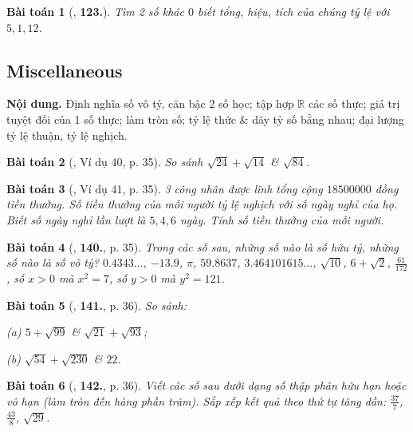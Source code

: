 \documentclass{article}
\numberwithin{equation}{section}
\newtheorem{baitoan}{Bài toán}
\begin{document}
\begin{baitoan}[\cite{Binh_Toan_7_tap_1}, \textbf{123.}]
	Tìm 2 số khác $0$ biết tổng, hiệu, tích của chúng tỷ lệ với $5,1,12$.
\end{baitoan}


\subsection{Miscellaneous}
\textsf{\textbf{Nội dung.} Định nghĩa số vô tỷ, căn bậc 2 số học; tập hợp $\mathbb{R}$ các số thực; giá trị tuyệt đối của 1 số thực; làm tròn số; tỷ lệ thức \& dãy tỷ số bằng nhau; đại lượng tỷ lệ thuận, tỷ lệ nghịch.}

\begin{baitoan}[\cite{Tuyen_Toan_7}, Ví dụ 40, p. 35]
	So sánh $\sqrt{24} + \sqrt{14}$ \& $\sqrt{84}$.
\end{baitoan}

\begin{baitoan}[\cite{Tuyen_Toan_7}, Ví dụ 41, p. 35]
	3 công nhân được lĩnh tổng cộng $18 500 000$ đồng tiền thưởng. Số tiền thưởng của mỗi người tỷ lệ nghịch với số ngày nghỉ của họ. Biết số ngày nghỉ lần lượt là $5,4,6$ ngày. Tính số tiền thưởng của mỗi người.
\end{baitoan}

\begin{baitoan}[\cite{Tuyen_Toan_7}, \textbf{140.}, p. 35]
	Trong các số sau, những số nào là số hữu tỷ, những số nào là số vô tỷ? $0.4343\ldots$, $-13.9$, $\pi$, $59.8637$, $3.464101615\ldots$, $\sqrt{10}$, $6 + \sqrt{2}$, $\frac{61}{172}$, số $x > 0$ mà $x^2 = 7$, số $y > 0$ mà $y^2 = 121$.
\end{baitoan}

\begin{baitoan}[\cite{Tuyen_Toan_7}, \textbf{141.}, p. 36]
	So sánh:
	\begin{enumerate*}
		\item[(a)] $5 + \sqrt{99}$ \& $\sqrt{21} + \sqrt{93}$;
		\item[(b)] $\sqrt{54} + \sqrt{230}$ \& $22$.
	\end{enumerate*}
\end{baitoan}

\begin{baitoan}[\cite{Tuyen_Toan_7}, \textbf{142.}, p. 36]
	Viết các số sau dưới dạng số thập phân hữu hạn hoặc vô hạn (làm tròn đến hàng phần trăm). Sắp xếp kết quả theo thứ tự tăng dần: $\frac{37}{7}$, $\frac{43}{8}$, $\sqrt{29}$.
\end{baitoan}
\end{document}

